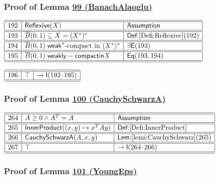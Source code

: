 \documentclass[11pt,reqno]{amsart}
\begin{document}
\medskip

\subsubsection*{Proof of Lemma \hyperlink{lem:BanachAlaoglu}{99 (\textsf{BanachAlaoglu})}}

\noindent$%
\begin{array}{|r|l|l|}
\hline\hline
192 & \mathsf{Reflexive}(X) & \textsf{Assumption} \\ \hline\hline
193 & \overline{B}(0,1)\subseteq X=(X^{*})^{*} & \textsf{Def:}\ref{Defi:Reflexive}(192) \\ \hline\hline
194 & \overline{B}(0,1)\;\mathsf{weak}^{*}\text{-compact in }(X^{*})^{*} & \exists\mathsf{E}(193) \\ \hline\hline
195 & \overline{B}(0,1)\;\mathsf{weakly-compact in }X & \mathsf{Eq}(193,194) \\ \hline\hline
\end{array}%
$

\medskip

\noindent$%
\begin{array}{|r|l|l|}
\hline\hline
196 & \top & \to\mathsf{I}(192\text{--}195) \\ \hline\hline
\end{array}%
$

\medskip

\subsubsection*{Proof of Lemma \hyperlink{lem:CauchySchwarzA}{100 (\textsf{CauchySchwarzA})}}

\noindent$%
\begin{array}{|r|l|l|}
\hline\hline
264 & A\ge0\wedge A^{T}=A & \textsf{Assumption} \\ \hline\hline
265 & \mathsf{InnerProduct}((x,y)\mapsto x^{T}Ay) & \textsf{Def:}\ref{Defi:InnerProduct} \\ \hline\hline
266 & \mathsf{CauchySchwarzA}(A,x,y) & \textsf{Lem:}\ref{lemi:CauchySchwarz}(265) \\ \hline\hline
267 & \top & \to\mathsf{I}(264\text{--}266) \\ \hline\hline
\end{array}%
$

\medskip

\subsubsection*{Proof of Lemma \hyperlink{lem:YoungEps}{101 (\textsf{YoungEps})}}
\end{document}
